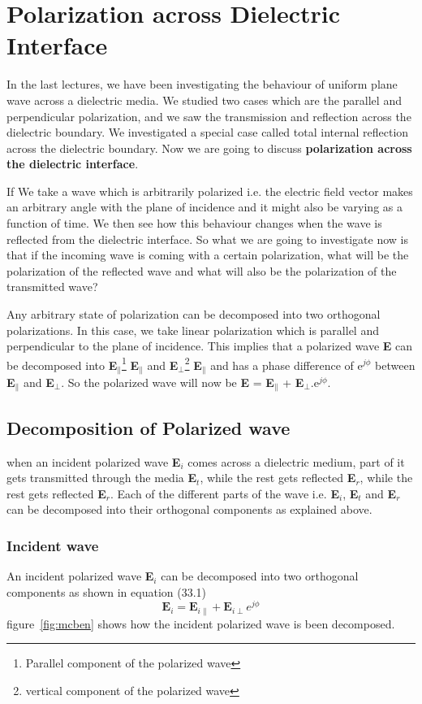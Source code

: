 \chapter{Polarization across Dielectric Interface}\label{lec:lec33}
In the last lectures, we have been investigating the behaviour of uniform plane wave across a dielectric media. We studied two cases which are the parallel and perpendicular polarization, and we saw the transmission and reflection across the dielectric boundary. We investigated a special case called total internal reflection across the dielectric boundary. Now we are going to discuss \textbf{polarization across the dielectric interface}. 

If We take a wave which is arbitrarily polarized i.e. the electric field vector makes an arbitrary angle with the plane of incidence and it might also be varying as a function of time. We then see how this behaviour changes when the wave is reflected from the dielectric interface. So what we are going to investigate now is that if the incoming wave is coming with a certain polarization, what will be the polarization of the reflected wave and what will also be the polarization of the transmitted wave?

Any arbitrary state of polarization can be decomposed into two orthogonal polarizations. In this case, we take linear polarization which is parallel and perpendicular to the plane of incidence. This implies that a polarized wave \textbf{E} can be decomposed into \textbf{E}$_\parallel$\footnote{Parallel component of the polarized wave} \textbf{E}$_\parallel$ and \textbf{E}$_\perp$\footnote{vertical component of the polarized wave} \textbf{E}$_\parallel$ and has a phase difference of e$^{j\phi}$ between \textbf{E}$_\parallel$ and \textbf{E}$_\perp$. So the polarized wave will now be \textbf{E} = \textbf{E}$_\parallel$ + \textbf{E}$_\perp$.e$^{j\phi}$.	
\section{Decomposition of Polarized wave}	
when an incident polarized wave \textbf{E$_i$} comes across a dielectric medium, part of it gets transmitted through the media \textbf{E$_t$}, while the rest gets reflected \textbf{E$_r$}, while the rest gets reflected \textbf{E$_r$}. Each of the different parts of the wave i.e. \textbf{E$_i$}, \textbf{E$_t$} and \textbf{E$_r$} can be decomposed into their orthogonal components as explained above.	
\subsection{Incident wave}	
An incident polarized wave \textbf{E$_i$} can be decomposed into two orthogonal components as shown in equation (33.1)	
\begin{equation}
\textbf{E}_i = \textbf{E}_{i\parallel} + \textbf{E}_{i\perp} e^{j\phi}
\end{equation}
figure~\ref{fig:mcben} shows how the incident polarized wave is been decomposed.	
